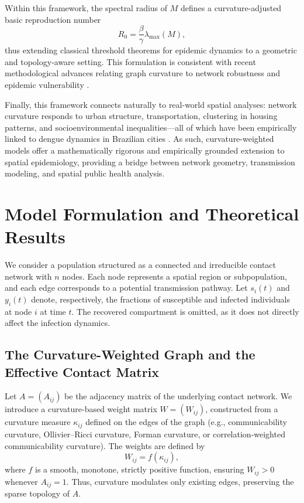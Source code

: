 \documentclass[final,3p,times,twocolumn]{elsarticle}
\begin{document}
Within this framework, the spectral radius of $M$ defines a curvature-adjusted
basic reproduction number
\[
    R_0 = \frac{\beta}{\gamma}\lambda_{\max}(M),
\]
thus extending classical threshold theorems for epidemic dynamics
\cite{keeling2008} to a geometric and topology-aware setting. This formulation
is consistent with recent methodological advances relating graph curvature to
network robustness and epidemic vulnerability \cite{de2021using}.

Finally, this framework connects naturally to real-world spatial analyses:
network curvature responds to urban structure, transportation, clustering in
housing patterns, and socioenvironmental inequalities—all of which have been
empirically linked to dengue dynamics in Brazilian cities \cite{oliveira2022,
FerreiraMelo2025, FerreiraMelo2025Dataset}. As such, curvature-weighted models
offer a mathematically rigorous and empirically grounded extension to spatial
epidemiology, providing a bridge between network geometry, transmission
modeling, and spatial public health analysis.

\section{Model Formulation and Theoretical Results}

We consider a population structured as a connected and irreducible contact network with $n$ nodes. Each node represents a spatial region or subpopulation, and each edge corresponds to a potential transmission pathway. Let $s_i(t)$ and $y_i(t)$ denote, respectively, the fractions of susceptible and infected individuals at node $i$ at time $t$. The recovered compartment is omitted, as it does not directly affect the infection dynamics.

\subsection{The Curvature-Weighted Graph and the Effective Contact Matrix}

Let $A = (A_{ij})$ be the adjacency matrix of the underlying contact network.  
We introduce a curvature-based weight matrix $W = (W_{ij})$, constructed from a curvature measure $\kappa_{ij}$ defined on the edges of the graph (e.g., communicability curvature, Ollivier--Ricci curvature, Forman curvature, or correlation-weighted communicability curvature).  
The weights are defined by
\[
    W_{ij} = f(\kappa_{ij}),
\]
where $f$ is a smooth, monotone, strictly positive function, ensuring $W_{ij}>0$ whenever $A_{ij}=1$. Thus, curvature modulates only existing edges, preserving the sparse topology of $A$.
\end{document}
